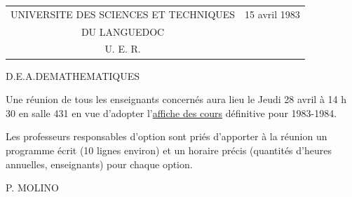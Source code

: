 \begin{tabular}{c@{\qquad\qquad}l}
UNIVERSITE DES SCIENCES ET TECHNIQUES & 15 avril 1983\\
DU LANGUEDOC &\\
U. E. R.\quad 5 &
\end{tabular}

\begin{center}
D.E.A.\quad DE\quad MATHEMATIQUES
\end{center}

Une réunion de tous les enseignants concernés aura lieu le
Jeudi 28 avril à 14 h 30 en salle 431 en vue d'adopter l'\uline{affiche des cours}
définitive pour 1983-1984.

Les professeurs responsables d'option sont priés d'apporter
à la réunion un programme écrit (10 lignes environ) et un horaire précis
(quantités d'heures annuelles, enseignants) pour chaque option.

\begin{flushright}P. MOLINO\end{flushright}
